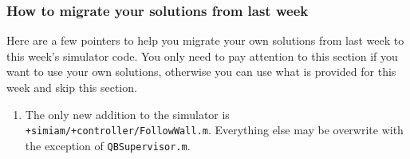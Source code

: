 \documentclass[10pt]{article}
\begin{document}
\subsubsection*{How to migrate your solutions from last week}
Here are a few pointers to help you migrate your own solutions from last week to this week's simulator code. You only need to pay attention to this section if you want to use your own solutions, otherwise you can use what is provided for this week and skip this section.

\begin{enumerate}
 \item The only new addition to the simulator is \texttt{+simiam/+controller/FollowWall.m}. Everything else may be overwrite with the exception of \texttt{QBSupervisor.m}.
\end{enumerate}
\end{document}
